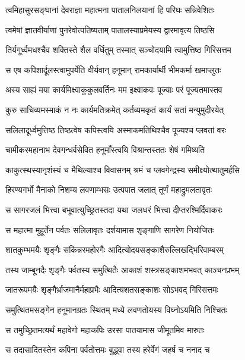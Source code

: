 \twolineshloka
{त्वमिहासुरसङ्घानां देवराज्ञा महात्मना}
{पातालनिलयानां हि परिघः सन्निवेशितः} %

\twolineshloka
{त्वमेषां ज्ञातवीर्याणां पुनरेवोत्पतिष्यताम्}
{पातालस्याप्रमेयस्य द्वारमावृत्य तिष्ठसि} %

\twolineshloka
{तिर्यगूर्ध्वमधश्चैव शक्तिस्ते शैल वर्धितुम्}
{तस्मात् सञ्चोदयामि त्वामुत्तिष्ठ गिरिसत्तम} %

\twolineshloka
{स एष कपिशार्दूलस्त्वामुपर्येति वीर्यवान्}
{हनूमान् रामकार्यार्थी भीमकर्मा खमाप्लुतः} %

\twolineshloka
{अस्य साह्यं मया कार्यमिक्ष्वाकुकुलवर्तिनः}
{मम इक्ष्वाकवः पूज्याः परं पूज्यतमास्तव} %

\twolineshloka
{कुरु साचिव्यमस्माकं न नः कार्यमतिक्रमेत्}
{कर्तव्यमकृतं कार्यं सतां मन्युमुदीरयेत्} %

\twolineshloka
{सलिलादूर्ध्वमुत्तिष्ठ तिष्ठत्वेष कपिस्त्वयि}
{अस्माकमतिथिश्चैव पूज्यश्च प्लवतां वरः} %

\twolineshloka
{चामीकरमहानाभ देवगन्धर्वसेवित}
{हनूमाँस्त्वयि विश्रान्तस्ततः शेषं गमिष्यति} %

\twolineshloka
{काकुत्स्थस्यानृशंस्यं च मैथिल्याश्च विवासनम्}
{श्रमं च प्लवगेन्द्रस्य समीक्ष्योत्थातुमर्हसि} %

\twolineshloka
{हिरण्यगर्भो मैनाको निशम्य लवणाम्भसः}
{उत्पपात जलात् तूर्णं महाद्रुमलतावृतः} %

\twolineshloka
{स सागरजलं भित्त्वा बभूवात्युच्छ्रितस्तदा}
{यथा जलधरं भित्त्वा दीप्तरश्मिर्दिवाकरः} %

\twolineshloka
{स महात्मा मुहूर्तेन पर्वतः सलिलावृतः}
{दर्शयामास शृङ्गाणि सागरेण नियोजितः} %

\twolineshloka
{शातकुम्भमयैः शृङ्गैः सकिन्नरमहोरगैः}
{आदित्योदयसङ्काशैरुल्लिखद्भिरिवाम्बरम्} %

\twolineshloka
{तस्य जाम्बूनदैः शृङ्गैः पर्वतस्य समुत्थितैः}
{आकाशं शस्त्रसङ्काशमभवत् काञ्चनप्रभम्} %

\twolineshloka
{जातरूपमयैः शृङ्गैर्भ्राजमानैर्महाप्रभैः}
{आदित्यशतसङ्काशः सोऽभवद् गिरिसत्तमः} %

\twolineshloka
{समुत्थितमसङ्गेन हनूमानग्रतः स्थितम्}
{मध्ये लवणतोयस्य विघ्नोऽयमिति निश्चितः} %

\twolineshloka
{स तमुच्छ्रितमत्यर्थं महावेगो महाकपिः}
{उरसा पातयामास जीमूतमिव मारुतः} %

\twolineshloka
{स तदासादितस्तेन कपिना पर्वतोत्तमः}
{बुद्ध्वा तस्य हरेर्वेगं जहर्ष च ननाद च} %

